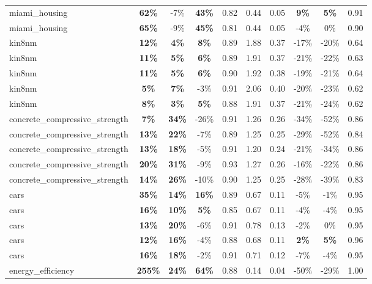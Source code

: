 \begin{table}[!htbp]
\begin{small}
\begin{sc}
{\begin{tabular}{lccccccccc}
miami\_housing & \textbf{62\%} & -7\% & \textbf{43\%} & 0.82 & 0.44 & 0.05 & \textbf{9\%} & \textbf{5\%} & 0.91 \\
miami\_housing & \textbf{65\%} & -9\% & \textbf{45\%} & 0.81 & 0.44 & 0.05 & -4\% & 0\% & 0.90 \\
kin8nm & \textbf{12\%} & \textbf{4\%} & \textbf{8\%} & 0.89 & 1.88 & 0.37 & -17\% & -20\% & 0.64 \\
kin8nm & \textbf{11\%} & \textbf{5\%} & \textbf{6\%} & 0.89 & 1.91 & 0.37 & -21\% & -22\% & 0.63 \\
kin8nm & \textbf{11\%} & \textbf{5\%} & \textbf{6\%} & 0.90 & 1.92 & 0.38 & -19\% & -21\% & 0.64 \\
kin8nm & \textbf{5\%} & \textbf{7\%} & -3\% & 0.91 & 2.06 & 0.40 & -20\% & -23\% & 0.62 \\
kin8nm & \textbf{8\%} & \textbf{3\%} & \textbf{5\%} & 0.88 & 1.91 & 0.37 & -21\% & -24\% & 0.62 \\
concrete\_compressive\_strength & \textbf{7\%} & \textbf{34\%} & -26\% & 0.91 & 1.26 & 0.26 & -34\% & -52\% & 0.86 \\
concrete\_compressive\_strength & \textbf{13\%} & \textbf{22\%} & -7\% & 0.89 & 1.25 & 0.25 & -29\% & -52\% & 0.84 \\
concrete\_compressive\_strength & \textbf{13\%} & \textbf{18\%} & -5\% & 0.91 & 1.20 & 0.24 & -21\% & -34\% & 0.86 \\
concrete\_compressive\_strength & \textbf{20\%} & \textbf{31\%} & -9\% & 0.93 & 1.27 & 0.26 & -16\% & -22\% & 0.86 \\
concrete\_compressive\_strength & \textbf{14\%} & \textbf{26\%} & -10\% & 0.90 & 1.25 & 0.25 & -28\% & -39\% & 0.83 \\
cars & \textbf{35\%} & \textbf{14\%} & \textbf{16\%} & 0.89 & 0.67 & 0.11 & -5\% & -1\% & 0.95 \\
cars & \textbf{16\%} & \textbf{10\%} & \textbf{5\%} & 0.85 & 0.67 & 0.11 & -4\% & -4\% & 0.95 \\
cars & \textbf{13\%} & \textbf{20\%} & -6\% & 0.91 & 0.78 & 0.13 & -2\% & 0\% & 0.95 \\
cars & \textbf{12\%} & \textbf{16\%} & -4\% & 0.88 & 0.68 & 0.11 & \textbf{2\%} & \textbf{5\%} & 0.96 \\
cars & \textbf{16\%} & \textbf{18\%} & -2\% & 0.91 & 0.71 & 0.12 & -7\% & -4\% & 0.95 \\
energy\_efficiency & \textbf{255\%} & \textbf{24\%} & \textbf{64\%} & 0.88 & 0.14 & 0.04 & -50\% & -29\% & 1.00 \\

\end{tabular}}
\end{sc}
\end{small}
\end{table}
